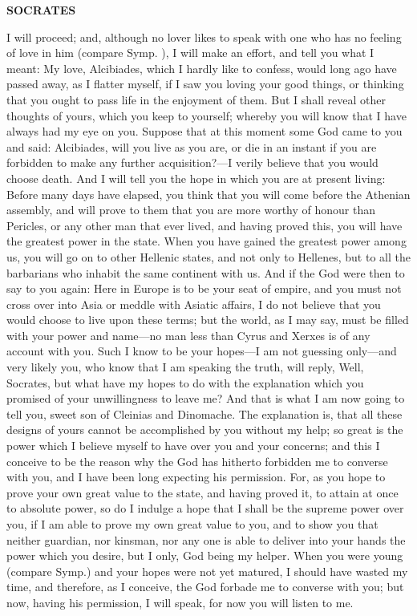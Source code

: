 \documentclass[11pt,letter]{article}
\begin{document}
\par \textbf{SOCRATES}
\par   I will proceed; and, although no lover likes to speak with one who has no feeling of love in him (compare Symp. ), I will make an effort, and tell you what I meant:  My love, Alcibiades, which I hardly like to confess, would long ago have passed away, as I flatter myself, if I saw you loving your good things, or thinking that you ought to pass life in the enjoyment of them. But I shall reveal other thoughts of yours, which you keep to yourself; whereby you will know that I have always had my eye on you. Suppose that at this moment some God came to you and said:  Alcibiades, will you live as you are, or die in an instant if you are forbidden to make any further acquisition?—I verily believe that you would choose death. And I will tell you the hope in which you are at present living:  Before many days have elapsed, you think that you will come before the Athenian assembly, and will prove to them that you are more worthy of honour than Pericles, or any other man that ever lived, and having proved this, you will have the greatest power in the state. When you have gained the greatest power among us, you will go on to other Hellenic states, and not only to Hellenes, but to all the barbarians who inhabit the same continent with us. And if the God were then to say to you again:  Here in Europe is to be your seat of empire, and you must not cross over into Asia or meddle with Asiatic affairs, I do not believe that you would choose to live upon these terms; but the world, as I may say, must be filled with your power and name—no man less than Cyrus and Xerxes is of any account with you. Such I know to be your hopes—I am not guessing only—and very likely you, who know that I am speaking the truth, will reply, Well, Socrates, but what have my hopes to do with the explanation which you promised of your unwillingness to leave me? And that is what I am now going to tell you, sweet son of Cleinias and Dinomache. The explanation is, that all these designs of yours cannot be accomplished by you without my help; so great is the power which I believe myself to have over you and your concerns; and this I conceive to be the reason why the God has hitherto forbidden me to converse with you, and I have been long expecting his permission. For, as you hope to prove your own great value to the state, and having proved it, to attain at once to absolute power, so do I indulge a hope that I shall be the supreme power over you, if I am able to prove my own great value to you, and to show you that neither guardian, nor kinsman, nor any one is able to deliver into your hands the power which you desire, but I only, God being my helper. When you were young (compare Symp.) and your hopes were not yet matured, I should have wasted my time, and therefore, as I conceive, the God forbade me to converse with you; but now, having his permission, I will speak, for now you will listen to me.
\end{document}
